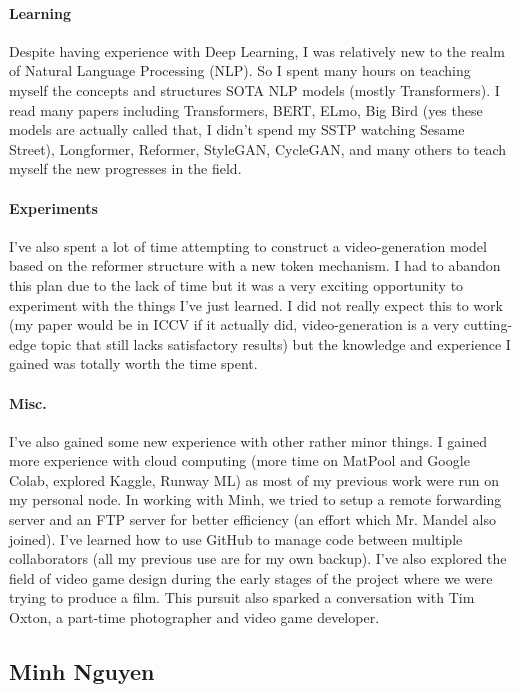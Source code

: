 \documentclass[12pt, letterpaper]{article}
\begin{document}
\paragraph{Learning}Despite having experience with Deep Learning, I was relatively new to the realm of Natural Language Processing (NLP). So I spent many hours on teaching myself the concepts and structures SOTA NLP models (mostly Transformers). I read many papers including Transformers, BERT, ELmo, Big Bird (yes these models are actually called that, I didn't spend my SSTP watching Sesame Street), Longformer, Reformer, StyleGAN, CycleGAN, and many others to teach myself the new progresses in the field.

\paragraph{Experiments}I've also spent a lot of time attempting to construct a video-generation model based on the reformer structure with a new token mechanism. I had to abandon this plan due to the lack of time but it was a very exciting opportunity to experiment with the things I've just learned. I did not really expect this to work (my paper would be in ICCV if it actually did, video-generation is a very cutting-edge topic that still lacks satisfactory results) but the knowledge and experience I gained was totally worth the time spent.

\paragraph{Misc.}I've also gained some new experience with other rather minor things. I gained more experience with cloud computing (more time on MatPool and Google Colab, explored Kaggle, Runway ML) as most of my previous work were run on my personal node. In working with Minh, we tried to setup a remote forwarding server and an FTP server for better efficiency (an effort which Mr. Mandel also joined). I've learned how to use GitHub to manage code between multiple collaborators (all my previous use are for my own backup). I've also explored the field of video game design during the early stages of the project where we were trying to produce a film. This pursuit also sparked a conversation with Tim Oxton, a part-time photographer and video game developer.


\subsection{Minh Nguyen}
\end{document}
